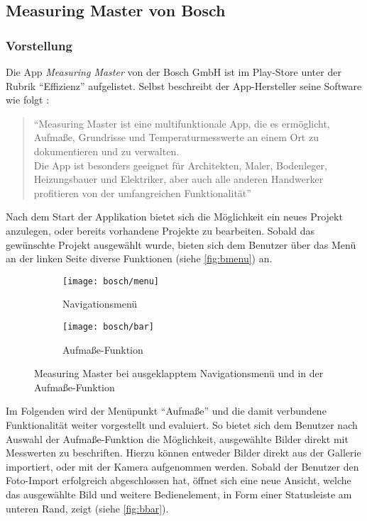 \subsection{Measuring Master von Bosch}

\subsubsection{Vorstellung}
Die App \emph{Measuring Master} von der Bosch GmbH ist im Play-Store unter der Rubrik ``Effizienz'' aufgelistet.
Selbst beschreibt der App-Hersteller seine Software wie folgt \citep{BoschMM}:

\begin{quote}
  ``Measuring Master ist eine multifunktionale App, die es ermöglicht, Aufmaße, Grundrisse und Temperaturmesswerte an einem Ort zu dokumentieren und zu verwalten.\\
  Die App ist besonders geeignet für Architekten, Maler, Bodenleger, Heizungsbauer und Elektriker, aber auch alle anderen Handwerker profitieren von der umfangreichen Funktionalität''
\end{quote}

\noindent
Nach dem Start der Applikation bietet sich die Möglichkeit ein neues Projekt anzulegen, oder bereits vorhandene Projekte zu bearbeiten.
Sobald das gewünschte Projekt ausgewählt wurde, bieten sich dem Benutzer über das Menü an der linken Seite diverse Funktionen (siehe \autoref{fig:bmenu}) an. \\

\begin{figure}[h]
  \centering
	\begin{subfigure}[t]{0.4\textwidth}
		\texttt{[image: bosch/menu]}
		\caption{Navigationsmenü}
		\label{fig:bmenu}	
	\end{subfigure}
	\begin{subfigure}[t]{0.4\textwidth}
		\texttt{[image: bosch/bar]}
		\caption{Aufmaße-Funktion}
		\label{fig:bbar}	
	\end{subfigure}
  \caption{Measuring Master bei ausgeklapptem Navigationsmenü und in der Aufmaße-Funktion}
\end{figure}

Im Folgenden wird der Menüpunkt ``Aufmaße'' und die damit verbundene Funktionalität weiter vorgestellt und evaluiert.
So bietet sich dem Benutzer nach Auswahl der Aufmaße-Funktion die Möglichkeit, ausgewählte Bilder direkt mit Messwerten zu beschriften.
Hierzu können entweder Bilder direkt aus der Gallerie importiert, oder mit der Kamera aufgenommen werden.
Sobald der Benutzer den Foto-Import erfolgreich abgeschlossen hat, öffnet sich eine neue Ansicht, welche das ausgewählte Bild und weitere Bedienelement, in Form einer Statusleiste am unteren Rand, zeigt (siehe \autoref{fig:bbar}). \\

